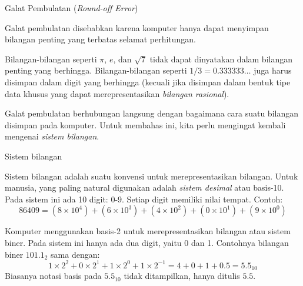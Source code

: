 
\begin{frame}{Galat Pembulatan (\textit{Round-off Error})}

Galat pembulatan disebabkan karena komputer hanya dapat menyimpan bilangan penting
yang terbatas selamat perhitungan.

Bilangan-bilangan seperti $\pi$, $e$, dan $\sqrt{7}$ tidak dapat dinyatakan
dalam bilangan penting yang berhingga.
Bilangan-bilangan seperti $1/3 = 0.333333\ldots$ juga harus disimpan dalam digit
yang berhingga (kecuali jika disimpan dalam bentuk tipe data khusus yang dapat merepresentasikan
\emph{bilangan rasional}).

Galat pembulatan berhubungan langsung dengan bagaimana cara suatu bilangan
disimpan pada komputer. Untuk membahas ini, kita perlu mengingat kembali
mengenai \emph{sistem bilangan}.

\end{frame}


\begin{frame}{Sistem bilangan}

Sistem bilangan adalah suatu konvensi untuk merepresentasikan bilangan.
Untuk manusia, yang paling natural digunakan adalah \emph{sistem desimal} atau
basis-10. Pada sistem ini ada 10 digit: 0-9. Setiap digit memiliki nilai tempat.
Contoh:
$$
86409 = (8 \times 10^4) + (6 \times 10^3) + (4 \times 10^2) + (0 \times 10^1) +
(9\times 10^0)
$$

Komputer menggunakan basis-2 untuk merepresentasikan bilangan atau sistem biner.
Pada sistem ini hanya ada dua digit, yaitu 0 dan 1.
Contohnya bilangan biner $101.1_{2}$ sama dengan:
\begin{equation*}
1 \times 2^2 + 0 \times 2^1 + 1 \times 2^0 + 1 \times 2^{-1} = 4 + 0 + 1 + 0.5 = 5.5_{10}
\end{equation*}
Biasanya notasi basis pada $5.5_{10}$ tidak ditampilkan, hanya ditulis $5.5$.

\end{frame}




